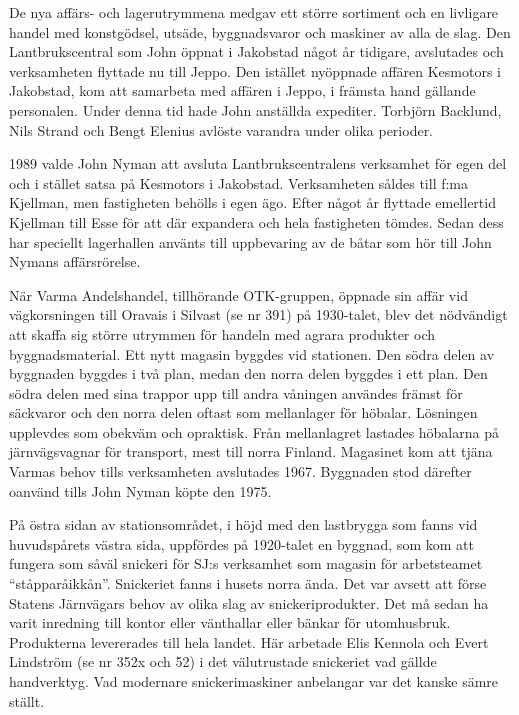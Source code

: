 De nya affärs- och lagerutrymmena medgav ett större sortiment och en livligare handel med konstgödsel, utsäde, byggnadsvaror och maskiner av alla de slag. Den Lantbrukscentral som John öppnat i Jakobstad något år tidigare, avslutades och verksamheten flyttade nu till Jeppo. Den istället nyöppnade affären Kesmotors i Jakobstad, kom att samarbeta med affären i Jeppo, i främsta hand gällande personalen. Under denna tid hade John anställda expediter. Torbjörn Backlund, Nils Strand och Bengt Elenius avlöste varandra under olika perioder.

1989 valde John Nyman att avsluta Lantbrukscentralens verksamhet för egen del och i stället satsa på Kesmotors i Jakobstad. Verksamheten såldes till f:ma Kjellman, men fastigheten behölls i egen ägo. Efter något år flyttade emellertid Kjellman till Esse för att där expandera  och hela fastigheten tömdes. Sedan dess har speciellt lagerhallen använts till uppbevaring av de båtar som hör till John Nymans affärsrörelse.


När Varma Andelshandel, tillhörande OTK-gruppen, öppnade sin affär vid vägkorsningen till Oravais i Silvast (se nr 391) på 1930-talet, blev det nödvändigt att skaffa sig större utrymmen för handeln med agrara produkter och byggnadsmaterial. Ett nytt magasin byggdes vid stationen. Den södra delen av byggnaden byggdes i två plan, medan den norra delen byggdes i ett plan. Den södra delen med sina trappor upp till andra våningen användes främst för säckvaror och den norra delen oftast som mellanlager för höbalar. Lösningen upplevdes som obekväm och opraktisk. Från mellanlagret lastades höbalarna på järnvägsvagnar för transport, mest till norra Finland. Magasinet kom att tjäna Varmas behov tills verksamheten avslutades 1967. Byggnaden stod därefter oanvänd tills John Nyman köpte den 1975.





På östra sidan av stationsområdet, i höjd med den lastbrygga som fanns vid huvudspårets västra sida, uppfördes på 1920-talet en byggnad, som kom att fungera som såväl snickeri för SJ:s verksamhet som magasin för arbetsteamet ``ståpparåikkån''. Snickeriet fanns i husets norra ända. Det var avsett att förse Statens Järnvägars behov av olika slag av snickeriprodukter. Det må sedan ha varit inredning till kontor eller vänthallar eller bänkar för utomhusbruk. Produkterna levererades till hela landet. Här arbetade Elis Kennola och Evert Lindström (se nr 352x och 52) i det välutrustade snickeriet vad gällde handverktyg. Vad modernare snickerimaskiner anbelangar var det kanske sämre ställt.

